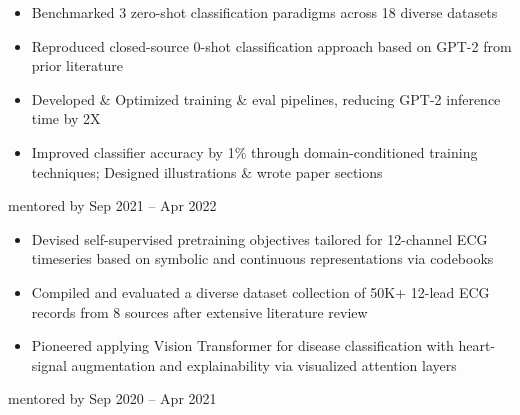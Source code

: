{\begin{itemize}
        \item Benchmarked 3 zero-shot classification paradigms across 18 diverse datasets

        \item Reproduced closed-source 0-shot classification approach based on GPT-2 from prior literature

        \item Developed \& Optimized training \& eval pipelines, reducing GPT-2 inference time by 2X

        \item Improved classifier accuracy by 1\% through domain-conditioned training techniques; Designed illustrations \& wrote paper sections
    \end{itemize}
    \dividerSmall


        {{\bodyfontsize \color{body} mentored by} }%
        {Sep 2021 -- Apr 2022}
        {}{}%
    \begin{itemize}%
        \item Devised self-supervised pretraining objectives tailored for 12-channel ECG timeseries based on symbolic and continuous representations via codebooks%
        \item Compiled and evaluated a diverse dataset collection of 50K+ 12-lead ECG records from 8 sources after extensive literature review%
        \item Pioneered applying Vision Transformer for disease classification with heart-signal augmentation and explainability via visualized attention layers%
    \end{itemize}%
    \dividerSmall
        {{\bodyfontsize \color{body} mentored by} }%
        {Sep 2020 -- Apr 2021}
        {}{}%
    \begin{itemize}%

\end{itemize}}
